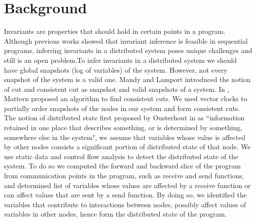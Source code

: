\section{Background}

Invariants are properties that should hold in certain points in a program. Although previous works \cite{ernst2001dynamically} showed that invariant inference is feasible in sequential programs, inferring invariants in a distributed system poses unique challenges and still is an open problem.To infer invariants in a distributed system we should have global snapshots (log of variables) of the system. However, not every snapshot of the system is a valid one. Mandy and Lamport introduced the notion of cut and consistent cut as snapshot and valid snapshots of a system. In \cite{mattern1989virtual}, Mattern proposed an algorithm to find consistent cuts. We used vector clocks \cite{vectorclock} to partially order snapshots of the nodes in our system and form consistent cuts. The notion of distributed state first proposed by Ousterhout in \cite{ousterhout1991role} as ``information retained in one place that describes something, or is determined by something, somewhere else in the system", we assume that variables whose value is affected by other nodes consists a significant portion of distributed state of that node. We use static data and control flow analysis to detect the distributed state of the system. To do so we computed the forward and backward slice of the program  \cite{programslice} from communication points in the program, such as receive and send functions, and determined list of variables whose values are affected by a receive function or can affect values that are sent by a send function. By doing so, we identified the variables that contribute to interactions between nodes, possibly affect values of variables in other nodes, hence form the distributed state of the program.

